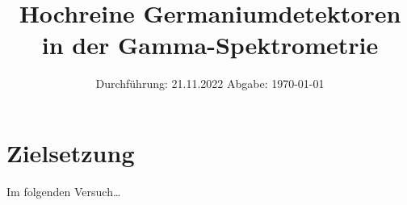 

\subject{V18}
\title{Hochreine Germaniumdetektoren in der Gamma-Spektrometrie}
\date{
    Durchführung: 21.11.2022
     \hspace{3em}
    Abgabe: \today %
}


\maketitle
\thispagestyle{empty}
\tableofcontents
\newpage

\section{Zielsetzung}

    Im folgenden Versuch… %


\clearpage


\clearpage


\clearpage


\clearpage

\printbibliography


